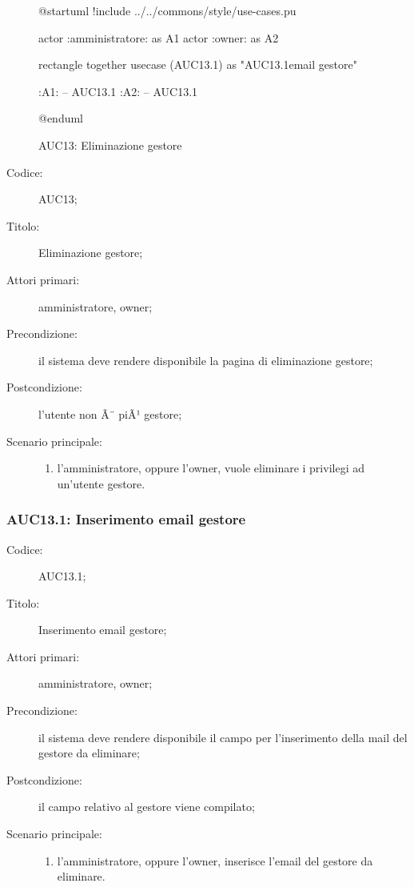 \documentclass[../../../analisi-dei-requisiti.tex]{subfiles}
\begin{document}
\begin{figure}[H]
  \centering
  \begin{plantuml}
  @startuml
  !include ../../commons/style/use-cases.pu

  actor :amministratore: as A1
  actor :owner: as A2


  rectangle {
    together {
      usecase (AUC13.1) as "AUC13.1\nInserimento email gestore"
    }
  }

  :A1: -- AUC13.1
  :A2: -- AUC13.1

  @enduml
  \end{plantuml}
  \caption{AUC13: Eliminazione gestore}%
  \label{fig:auc13}
\end{figure}

\begin{description}
  \item[Codice:] AUC13;
  \item[Titolo:] Eliminazione gestore;
  \item[Attori primari:] amministratore, owner;
  \item[Precondizione:] il sistema deve rendere disponibile la pagina di eliminazione gestore;
  \item[Postcondizione:] l'utente non Ã¨ piÃ¹ gestore;
  \item[Scenario principale:]
  \begin{enumerate}
    \item l'amministratore, oppure l'owner, vuole eliminare i privilegi ad un'utente gestore.
  \end{enumerate}
\end{description}

\subsubsection{AUC13.1: Inserimento email gestore}%
\label{subs:AUC13.1}
\begin{description}
  \item[Codice:] AUC13.1;
  \item[Titolo:] Inserimento email gestore;
  \item[Attori primari:] amministratore, owner;
  \item[Precondizione:] il sistema deve rendere disponibile il campo per l'inserimento della mail del gestore da eliminare;
  \item[Postcondizione:] il campo relativo al gestore viene compilato;
  \item[Scenario principale:]
  \begin{enumerate}
    \item l'amministratore, oppure l'owner, inserisce l'email del gestore da eliminare.
  \end{enumerate}
\end{description}
\end{document}
